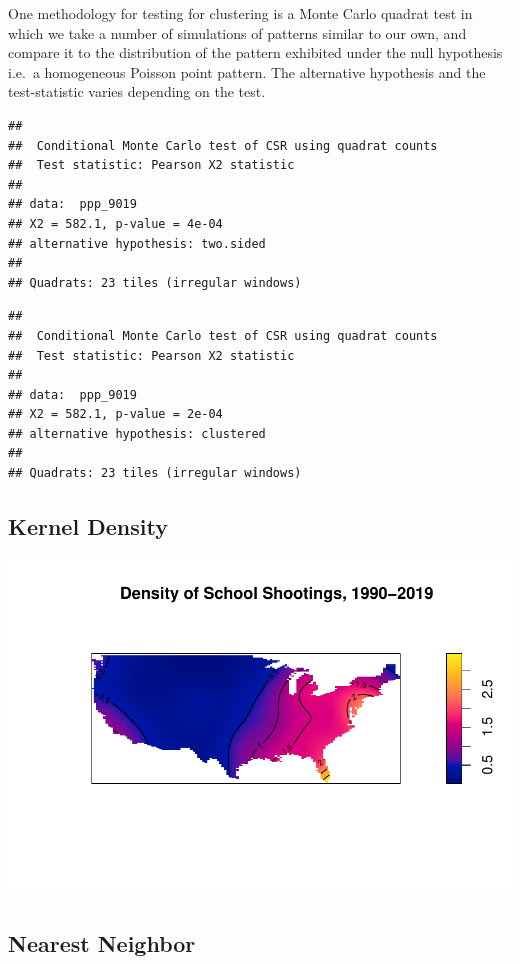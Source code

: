 \documentclass[12pt]{article}
\begin{document}
One methodology for testing for clustering is a Monte Carlo quadrat test in which we take a number of simulations of patterns similar to our own, and compare it to the distribution of the pattern exhibited under the null hypothesis i.e.~a homogeneous Poisson point pattern. The alternative hypothesis and the test-statistic varies depending on the test.

\begin{verbatim}
## 
##  Conditional Monte Carlo test of CSR using quadrat counts
##  Test statistic: Pearson X2 statistic
## 
## data:  ppp_9019
## X2 = 582.1, p-value = 4e-04
## alternative hypothesis: two.sided
## 
## Quadrats: 23 tiles (irregular windows)
\end{verbatim}

\begin{verbatim}
## 
##  Conditional Monte Carlo test of CSR using quadrat counts
##  Test statistic: Pearson X2 statistic
## 
## data:  ppp_9019
## X2 = 582.1, p-value = 2e-04
## alternative hypothesis: clustered
## 
## Quadrats: 23 tiles (irregular windows)
\end{verbatim}

\hypertarget{kernel-density}{%
\subsection{Kernel Density}\label{kernel-density}}

\includegraphics{JStevenRaquel_STATS295_Final_files/figure-latex/density-90-19-1.pdf}

\hypertarget{nearest-neighbor}{%
\subsection{Nearest Neighbor}\label{nearest-neighbor}}
\end{document}
